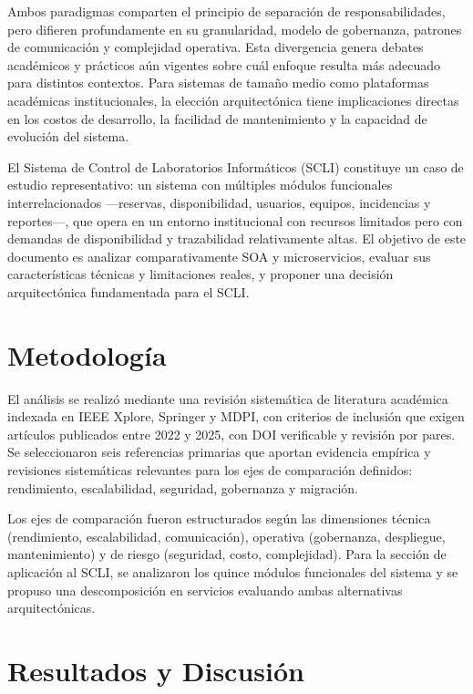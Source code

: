 \documentclass[10pt,twocolumn,letterpaper]{article}
\begin{document}
Ambos paradigmas comparten el principio de separación de responsabilidades, pero difieren profundamente en su granularidad, modelo de gobernanza, patrones de comunicación y complejidad operativa. Esta divergencia genera debates académicos y prácticos aún vigentes sobre cuál enfoque resulta más adecuado para distintos contextos. Para sistemas de tamaño medio como plataformas académicas institucionales, la elección arquitectónica tiene implicaciones directas en los costos de desarrollo, la facilidad de mantenimiento y la capacidad de evolución del sistema.

El Sistema de Control de Laboratorios Informáticos (SCLI) constituye un caso de estudio representativo: un sistema con múltiples módulos funcionales interrelacionados ---reservas, disponibilidad, usuarios, equipos, incidencias y reportes---, que opera en un entorno institucional con recursos limitados pero con demandas de disponibilidad y trazabilidad relativamente altas. El objetivo de este documento es analizar comparativamente SOA y microservicios, evaluar sus características técnicas y limitaciones reales, y proponer una decisión arquitectónica fundamentada para el SCLI.

\section{Metodología}

El análisis se realizó mediante una revisión sistemática de literatura académica indexada en IEEE Xplore, Springer y MDPI, con criterios de inclusión que exigen artículos publicados entre 2022 y 2025, con DOI verificable y revisión por pares. Se seleccionaron seis referencias primarias que aportan evidencia empírica y revisiones sistemáticas relevantes para los ejes de comparación definidos: rendimiento, escalabilidad, seguridad, gobernanza y migración.

Los ejes de comparación fueron estructurados según las dimensiones técnica (rendimiento, escalabilidad, comunicación), operativa (gobernanza, despliegue, mantenimiento) y de riesgo (seguridad, costo, complejidad). Para la sección de aplicación al SCLI, se analizaron los quince módulos funcionales del sistema y se propuso una descomposición en servicios evaluando ambas alternativas arquitectónicas.

\section{Resultados y Discusión}
\end{document}
